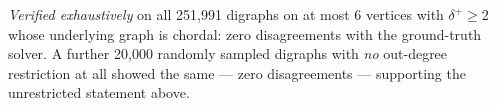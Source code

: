 \documentclass[11pt]{article}
\theoremstyle{plain}
\theoremstyle{definition}
\begin{document}
\bigskip
\noindent\emph{Verified exhaustively} on all 251{,}991 digraphs on at most 6
vertices with $\delta^+ \ge 2$ whose underlying graph is chordal: zero
disagreements with the ground-truth solver. A further 20{,}000 randomly sampled
digraphs with \emph{no} out-degree restriction at all showed the same — zero
disagreements — supporting the unrestricted statement above.
\end{document}
